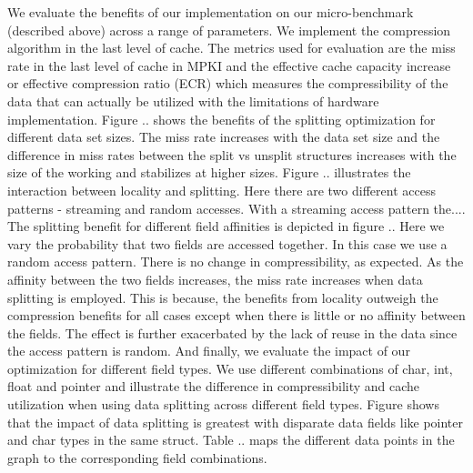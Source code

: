 We evaluate the benefits of our implementation on our micro-benchmark (described above) across a range of parameters. We implement the compression algorithm in the last level of cache. The metrics used for evaluation are the miss rate in the last level of cache in MPKI and the effective cache capacity increase or effective compression ratio (ECR) which measures the compressibility of the data that can actually be utilized with the limitations of hardware implementation. Figure .. shows the benefits of the splitting optimization for different data set sizes. The miss rate increases with the data set size and the difference in miss rates between the split vs unsplit structures increases with the size of the working and stabilizes at higher sizes. Figure .. illustrates the interaction between locality and splitting. Here there are two different access patterns - streaming and random accesses. With a streaming access pattern the.... The splitting benefit for different field affinities is depicted in figure .. Here we vary the probability that two fields are accessed together. In this case we use a random access pattern. There is no change in compressibility, as expected. As the affinity between the two fields increases, the miss rate increases when data splitting is employed. This is because, the benefits from locality outweigh the compression benefits for all cases except when there is little or no affinity between the fields. The effect is further exacerbated by the lack of reuse in the data since the access pattern is random. And finally, we evaluate the impact of our optimization for different field types. We use different combinations of char, int, float and pointer and illustrate the difference in compressibility and cache utilization when using data splitting across different field types. Figure shows that the impact of data splitting is greatest with disparate data fields like pointer and char types in the same struct. Table .. maps the different data points in the graph to the corresponding field combinations. 
